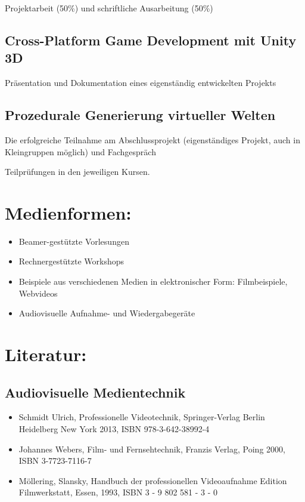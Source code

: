 Projektarbeit (50\%) und schriftliche Ausarbeitung (50\%)

\subsection*{Cross-Platform Game Development mit Unity
3D}\label{cross-platform-game-development-mit-unity-3d-2}

Präsentation und Dokumentation eines eigenständig entwickelten Projekts

\subsection*{Prozedurale Generierung virtueller
Welten}\label{prozedurale-generierung-virtueller-welten-2}

Die erfolgreiche Teilnahme am Abschlussprojekt (eigenständiges Projekt,
auch in Kleingruppen möglich) und Fachgespräch

Teilprüfungen in den jeweiligen Kursen.

\section*{Medienformen:}\label{medienformen-16}

\begin{itemize}
\tightlist
\item
  Beamer-gestützte Vorlesungen
\item
  Rechnergestützte Workshops
\item
  Beispiele aus verschiedenen Medien in elektronischer Form:
  Filmbeispiele, Webvideos
\item
  Audiovisuelle Aufnahme- und Wiedergabegeräte
\end{itemize}

\section*{Literatur:}\label{literatur-21}

\subsection*{Audiovisuelle
Medientechnik}\label{audiovisuelle-medientechnik-3}

\begin{itemize}
\tightlist
\item
  Schmidt Ulrich, Professionelle Videotechnik, Springer-Verlag Berlin
  Heidelberg New York 2013, ISBN 978-3-642-38992-4
\item
  Johannes Webers, Film- und Fernsehtechnik, Franzis Verlag, Poing 2000,
  ISBN 3-7723-7116-7
\item
  Möllering, Slansky, Handbuch der professionellen Videoaufnahme Edition
  Filmwerkstatt, Essen, 1993, ISBN 3 - 9 802 581 - 3 - 0
\end{itemize}

